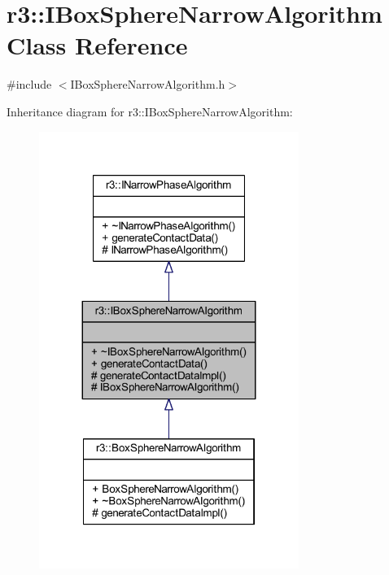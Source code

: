 \hypertarget{classr3_1_1_i_box_sphere_narrow_algorithm}{}\section{r3\+:\+:I\+Box\+Sphere\+Narrow\+Algorithm Class Reference}
\label{classr3_1_1_i_box_sphere_narrow_algorithm}


{\ttfamily \#include $<$I\+Box\+Sphere\+Narrow\+Algorithm.\+h$>$}



Inheritance diagram for r3\+:\+:I\+Box\+Sphere\+Narrow\+Algorithm\+:\nopagebreak
\begin{figure}[H]
\begin{center}
\leavevmode
\includegraphics[width=239pt]{classr3_1_1_i_box_sphere_narrow_algorithm__inherit__graph}
\end{center}
\end{figure}


